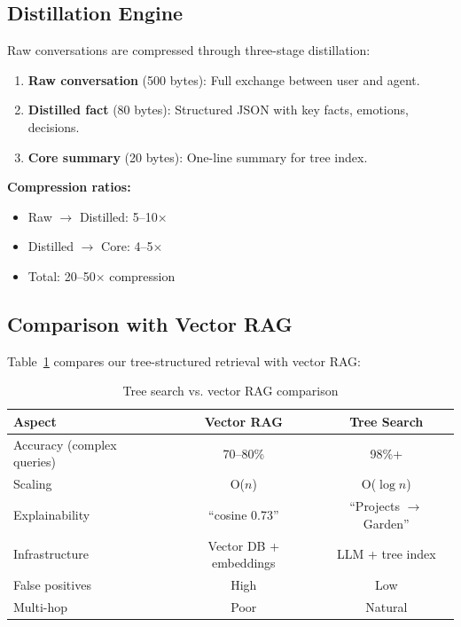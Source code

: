 \documentclass{article}
\begin{document}
\subsection{Distillation Engine}

Raw conversations are compressed through three-stage distillation:

\begin{enumerate}[leftmargin=*]
    \item \textbf{Raw conversation} (500 bytes): Full exchange between user and agent.
    \item \textbf{Distilled fact} (80 bytes): Structured JSON with key facts, emotions, decisions.
    \item \textbf{Core summary} (20 bytes): One-line summary for tree index.
\end{enumerate}

\textbf{Compression ratios:}
\begin{itemize}[leftmargin=*]
    \item Raw $\to$ Distilled: 5--10$\times$
    \item Distilled $\to$ Core: 4--5$\times$
    \item Total: 20--50$\times$ compression
\end{itemize}

\subsection{Comparison with Vector RAG}

Table~\ref{tab:memory_comparison} compares our tree-structured retrieval with vector RAG:

\begin{table}[h]
\centering
\caption{Tree search vs. vector RAG comparison}
\label{tab:memory_comparison}
\begin{tabular}{lcc}
\toprule
\textbf{Aspect} & \textbf{Vector RAG} & \textbf{Tree Search} \\
\midrule
Accuracy (complex queries) & 70--80\% & 98\%+ \\
Scaling & O($n$) & O($\log n$) \\
Explainability & ``cosine 0.73'' & ``Projects $\to$ Garden'' \\
Infrastructure & Vector DB + embeddings & LLM + tree index \\
False positives & High & Low \\
Multi-hop & Poor & Natural \\
\bottomrule
\end{tabular}
\end{table}
\end{document}
